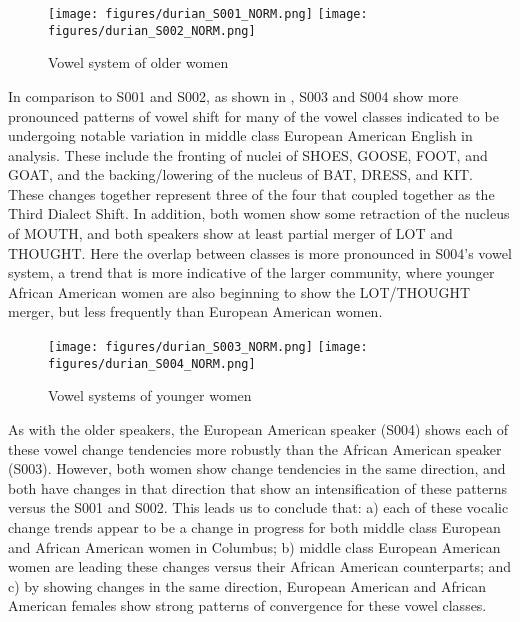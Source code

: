 \documentclass[output=paper,colorlinks,citecolor=brown]{langscibook}
\begin{document}
\begin{figure}
  {
\texttt{[image: figures/durian\_S001\_NORM.png]}
}
  {
 \texttt{[image: figures/durian\_S002\_NORM.png]}
 }
      \caption{Vowel system of older women}
      \label{fig:durian:oldwomen}
\end{figure}

  In comparison to S001 and S002, as shown in ,  S003 and S004 show more pronounced patterns of vowel shift for many of the vowel classes indicated to be undergoing notable variation in middle class European American English in  analysis. These include the fronting of nuclei of SHOES, GOOSE, FOOT, and GOAT, and the backing/lowering of the nucleus of BAT, DRESS, and KIT. These changes together represent three of the four that \citet{durian2012new} coupled together as the Third Dialect Shift. In addition, both women show some retraction of the nucleus of MOUTH, and both speakers show at least partial merger of LOT and THOUGHT. Here the overlap between classes is more pronounced in S004's vowel system, a trend that is more indicative of the larger community, where younger African American women are also beginning to show the LOT/THOUGHT merger, but less frequently than European American women.

\begin{figure}
  \subfigure %
  {
 \texttt{[image: figures/durian\_S003\_NORM.png]}
 }
  \subfigure%
  {
 \texttt{[image: figures/durian\_S004\_NORM.png]}
 }
    \caption{Vowel systems of younger women}
     \label{fig:durian:youngwomen}
\end{figure}

As with the older speakers, the European American speaker (S004) shows each of these vowel change tendencies more robustly than the African American speaker (S003). However, both women show change tendencies in the same direction, and both have changes in that direction that show an intensification of these patterns versus the S001 and S002. This leads us to conclude that: a) each of these vocalic change trends appear to be a change in progress for both middle class European and African American women in Columbus; b) middle class European American women are leading these changes versus their African American counterparts; and c) by showing changes in the same direction, European American and African American females show strong patterns of convergence for these vowel classes.
\end{document}
